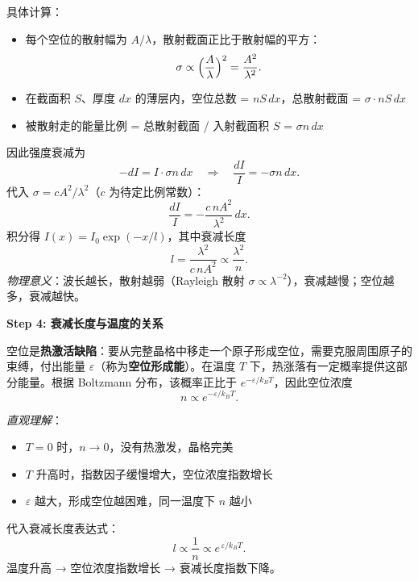 \begin{derivationbox}[标准解题过程]
具体计算：
\begin{itemize}
    \item 每个空位的散射幅为 $A/\lambda$，散射截面正比于散射幅的平方：
    \begin{equation}
    \sigma \propto \Bigl(\frac{A}{\lambda}\Bigr)^2 = \frac{A^2}{\lambda^2}.
    \end{equation}
    \item 在截面积 $S$、厚度 $dx$ 的薄层内，空位总数 = $nS\,dx$，总散射截面 = $\sigma\cdot nS\,dx$
    \item 被散射走的能量比例 = 总散射截面 / 入射截面积 $S$ = $\sigma n\,dx$
\end{itemize}
因此强度衰减为
\begin{equation}
-dI = I\cdot\sigma n\,dx \quad\Longrightarrow\quad \frac{dI}{I} = -\sigma n\,dx.
\end{equation}
代入 $\sigma=cA^2/\lambda^2$（$c$ 为待定比例常数）：
\begin{equation}
\frac{dI}{I} = -\frac{c\,nA^2}{\lambda^2}\,dx.
\end{equation}
积分得 $I(x)=I_0\exp(-x/l)$，其中衰减长度
\begin{equation}
\boxed{l = \frac{\lambda^2}{c\,nA^2}\propto\frac{\lambda^2}{n}.}
\end{equation}
\textit{物理意义}：波长越长，散射越弱（Rayleigh 散射 $\sigma\propto\lambda^{-2}$），衰减越慢；空位越多，衰减越快。

\textbf{Step 4: 衰减长度与温度的关系}

空位是\textbf{热激活缺陷}：要从完整晶格中移走一个原子形成空位，需要克服周围原子的束缚，付出能量 $\varepsilon$（称为\textbf{空位形成能}）。在温度 $T$ 下，热涨落有一定概率提供这部分能量。根据 Boltzmann 分布，该概率正比于 $e^{-\varepsilon/k_BT}$，因此空位浓度
\begin{equation}
n \propto e^{-\varepsilon/k_BT}.
\end{equation}

\textit{直观理解}：
\begin{itemize}
    \item $T=0$ 时，$n\to0$，没有热激发，晶格完美
    \item $T$ 升高时，指数因子缓慢增大，空位浓度指数增长
    \item $\varepsilon$ 越大，形成空位越困难，同一温度下 $n$ 越小
\end{itemize}

代入衰减长度表达式：
\begin{equation}
\boxed{l \propto \frac{1}{n} \propto e^{\,\varepsilon/k_BT}.}
\end{equation}
温度升高 → 空位浓度指数增长 → 衰减长度指数下降。


\end{derivationbox}
